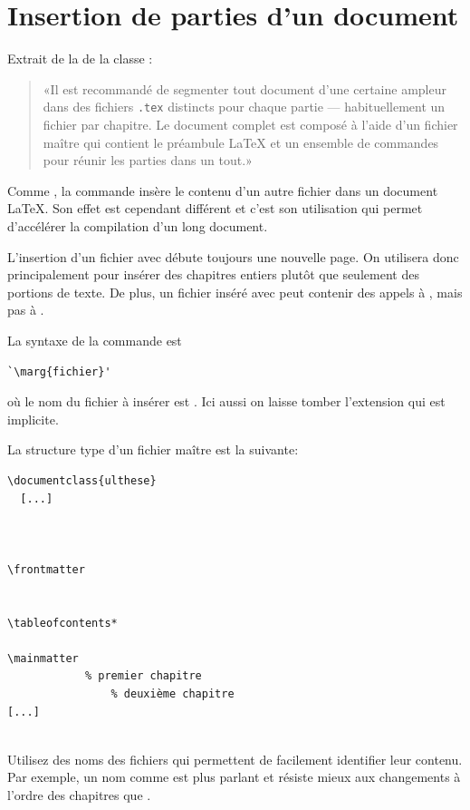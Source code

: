 \section{Insertion de parties d'un document}
\label{sec:include:include}

Extrait de la %
de la classe :
\begin{quote}
  «Il est recommandé de segmenter tout document d'une certaine ampleur
  dans des fichiers \verb=.tex= distincts pour chaque partie ---
  habituellement un fichier par chapitre. Le document complet est
  composé à l'aide d'un fichier maître qui contient le préambule
  {\LaTeX} et un ensemble de commandes \verb== pour réunir les
  parties dans un tout.»
\end{quote}

Comme \cmd{}, la commande \cmd{} insère le contenu
d'un autre fichier dans un document {\LaTeX}. Son effet est cependant
différent et c'est son utilisation qui permet d'accélérer la
compilation d'un long document.

L'insertion d'un fichier avec \cmd{} débute toujours une
nouvelle page. On utilisera donc \cmd{} principalement pour
insérer des chapitres entiers plutôt que seulement des portions de
texte. De plus, un fichier inséré avec \cmd{} peut contenir
des appels à \cmd{}, mais pas à \cmd{}.

La syntaxe de la commande \cmd{} est
\begin{lstlisting}
`\marg{fichier}'
\end{lstlisting}
où le nom du fichier à insérer est . Ici
aussi on laisse tomber l'extension  qui est implicite.

 La structure type d'un fichier maître est la suivante:
\begin{lstlisting}
\documentclass{ulthese}
  [...]



\frontmatter


\tableofcontents*

\mainmatter
            % premier chapitre
                % deuxième chapitre
[...]


\end{lstlisting}

\begin{conseil}
  Utilisez des noms des fichiers qui permettent de facilement
  identifier leur contenu. Par exemple, un nom comme
   est plus parlant et résiste mieux aux
  changements à l'ordre des chapitres que .
\end{conseil}

